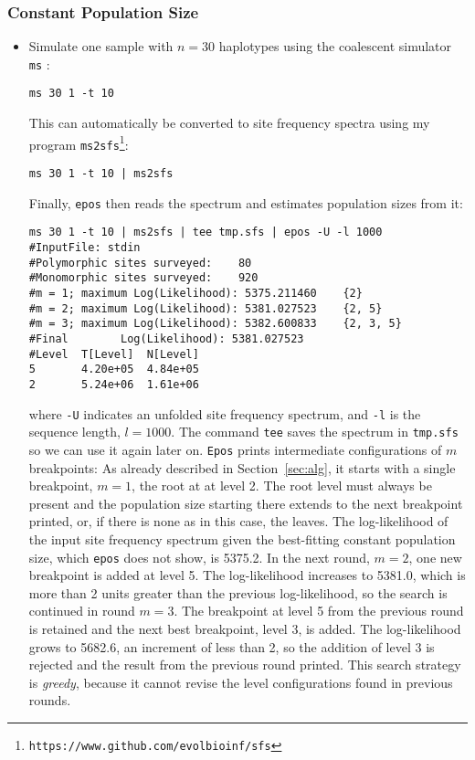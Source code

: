 \documentclass[a4paper, english]{article}
\newcommand{\ty}{\texttt}
\begin{document}
\subsubsection{Constant Population Size}
\begin{itemize}
\item Simulate one sample with
  $n=30$ haplotypes using the coalescent simulator \ty{ms} \citep{hud02:gen}:
\begin{verbatim}
ms 30 1 -t 10 
\end{verbatim}
This can automatically be converted to site frequency spectra using
my program \ty{ms2sfs}\footnote{\ty{https://www.github.com/evolbioinf/sfs}}:
\begin{verbatim}
ms 30 1 -t 10 | ms2sfs
\end{verbatim}
Finally, \ty{epos} then reads the spectrum and estimates population
sizes from it:
\begin{verbatim}
ms 30 1 -t 10 | ms2sfs | tee tmp.sfs | epos -U -l 1000
#InputFile:	stdin
#Polymorphic sites surveyed:	80
#Monomorphic sites surveyed:	920
#m = 1; maximum Log(Likelihood): 5375.211460	{2}
#m = 2; maximum Log(Likelihood): 5381.027523	{2, 5}
#m = 3; maximum Log(Likelihood): 5382.600833	{2, 3, 5}
#Final        Log(Likelihood): 5381.027523
#Level  T[Level]  N[Level]
5       4.20e+05  4.84e+05
2       5.24e+06  1.61e+06
\end{verbatim}
where \ty{-U} indicates an unfolded site frequency spectrum, and
\ty{-l} is the sequence length, $l=1000$. The command \ty{tee} saves
the spectrum in \ty{tmp.sfs} so we can use it again later on.
\ty{Epos} prints intermediate configurations of $m$ breakpoints: As
already described in Section~\ref{sec:alg}, it starts with a single
breakpoint, $m=1$, the root at at level 2. The root level must always
be present and the population size starting there extends to the next
breakpoint printed, or, if there is none as in this case, the
leaves. The log-likelihood of the input site frequency spectrum given
the best-fitting constant population size, which \ty{epos} does not
show, is 5375.2. In the next round, $m=2$, one new breakpoint is added
at level 5. The log-likelihood increases to 5381.0, which is more than
2 units greater than the previous log-likelihood, so the search is
continued in round $m=3$. The breakpoint at level 5 from the previous
round is retained and the next best breakpoint, level 3, is added. The
log-likelihood grows to 5682.6, an increment of less than 2, so the
addition of level 3 is rejected and the result from the previous round
printed. This search strategy is \emph{greedy}, because it cannot
revise the level configurations found in previous rounds.


\end{itemize}
\end{document}
